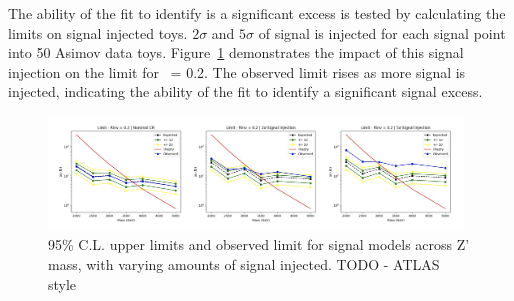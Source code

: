 
The ability of the fit to identify is a significant excess is tested by calculating the limits on signal injected toys. $2\sigma$ and $5\sigma$ of signal is injected for each signal point into 50 Asimov data toys.
Figure~\ref{fig:lim_sig_inj} demonstrates the impact of this signal injection on the limit for \rinv~= 0.2.
The observed limit rises as more signal is injected, indicating the ability of the fit to identify a significant signal excess. 

\begin{figure}[!htbp]
\centering
   \includegraphics[width=0.98\textwidth]{figures/stats/lim_sig_inj}
    \caption{95\% C.L. upper limits and observed limit for signal models across Z' mass, with varying amounts of signal injected. TODO - ATLAS style
    \label{fig:lim_sig_inj}}
\end{figure}


